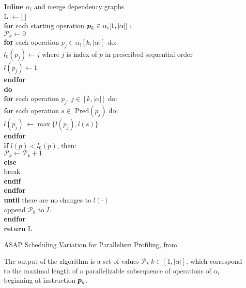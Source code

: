 \documentclass[12pt,twoside]{article}
\begin{document}
	\begin{algorithm}[h]
		\begin{algorithmic}
		\item \textbf{Inline} $\alpha_i$ and merge dependency graphs\\
		L $\leftarrow \lbrack\  \rbrack$\\
		\textbf{for} each starting operation $\boldsymbol{p}_k \in \alpha_i[1,|\alpha|]:$\\
		\quad $\mathcal{P}_k \leftarrow 0$\\
			\quad \textbf{for} each operation $p_j \in \alpha_i[k,|\alpha|]$ do:\\
			\quad \quad $l_0(p_j) \leftarrow j$ where $j$ is index of $p$ in prescribed sequential order\\
			\quad \quad $l(p_j) \leftarrow 1$\\

		\quad \textbf{endfor}\\
		\quad \textbf{do}\\
		 	\quad\quad \textbf{for} each operation $p_j$, $j \in [k,|\alpha|]$ do:\\
			\quad\quad\quad \textbf{for} each operation $s \in \text{ Pred}(p_j)$ do:\\
			\quad\quad \quad\quad  $l(p_j)\ \leftarrow \max\{l(p_j), l(s)\}$\\
			\quad\quad\quad \textbf{endfor}\\
		 	\quad \quad \quad \textbf{if} $l(p) < l_0(p)$, then:\\
		 	\quad \quad \quad \quad $\mathcal{P}_{k} \leftarrow \mathcal{P}_{k} + 1$\\
		 	\quad \quad \quad \textbf{else}\\
		 	\quad \quad \quad \quad break\\
		 	\quad \quad \quad \textbf{endif}\\
		 	\quad \quad \textbf{endfor}\\
		\quad \textbf{until} there are no changes to $l(\cdot)$\\
			\quad append $\mathcal{P}_{k}$ to $L$\\ 
		\textbf{endfor}\\
		\textbf{return} L\\
		\end{algorithmic}
	\caption{ASAP Scheduling Variation for Parallelism Profiling, from \cite{aiken_2016}}
	\label{alg:parprof}
	\end{algorithm}
	The output of the algorithm is a set of values $\mathcal{P}_k\ k \in [1,|\alpha|]$, which correspond to the maximal length of a parallelizable subsequence of operations of $\alpha_i$ beginning at instruction $\boldsymbol{p}_k$.
\end{document}
